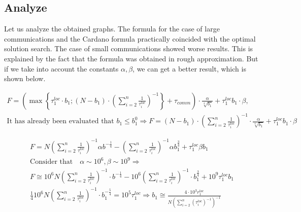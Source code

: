 \documentclass{article}
\begin{document}
\subsection{Analyze}
Let us analyze the obtained graphs. The formula for the case of large communications and the Cardano formula practically coincided with the optimal solution search. The case of small communications showed worse results. This is explained by the fact that the formula was obtained in rough approximation. But if we take into account the constants $\alpha, \beta$, we can get a better result, which is shown below.



\begin{gather*}
    F=\left(\max \left\{\tau_1^{loc} \cdot b_1 ;\left(N-b_1\right) \cdot\left(\sum_{i=2}^n \frac{1}{\tau_i^{loc}}\right)^{-1}\right\}+\tau_{comm}\right) \cdot \frac{\alpha}{\sqrt[4]{b_1}}+\tau_1^{loc} b_1 \cdot \beta, \\
    \text {It has already been evaluated that } b_1 \leq b_1^0 \Rightarrow F=\left(N-b_1\right)\cdot \left(\sum_{i=2}^n \frac{1}{\tau_i^{loc}}\right)^{-1} \cdot \frac{\alpha}{\sqrt[4]{b_1}}+\tau_1^{loc} b_1 \cdot \beta
\end{gather*}


\begin{gather*}
    F=N\left(\sum_{i=2}^n \frac{1}{\tau_i^{loc}}\right)^{-1} \alpha b^{-\frac{1}{4}}-\left(\sum_{i=2}^n \frac{1}{\tau_i^{loc}}\right)^{-1} \alpha b_1^{\frac{3}{4}}+\tau_1^{l o c} \beta b_1 \\
    \text {Consider that} \quad \alpha \sim 10^6, \beta \sim 10^9 \Rightarrow \\ 
    F \cong 10^6 N \left(\sum_{i=2}^n \frac{1}{\tau_i^{loc}}\right)^{-1} \cdot b^{-\frac{1}{4}}-10^6 \left(\sum_{i=2}^n \frac{1}{\tau_i^{loc}}\right)^{-1} \cdot b_1^{\frac{3}{4}}+10^9 \tau_1^{loc} b_1 \\
    \frac{1}{4} 10^6 N \left(\sum_{i=2}^n \frac{1}{\tau_i^{loc}}\right)^{-1} \cdot b_1^{-\frac{5}{4}}=10^5 \tau_1^{loc} \Rightarrow b_1 \cong \frac{4 \cdot 10^3 r_1^{loc}}{N\left(\sum_{i=2}^n\left(\tau_i^{loc}\right)^{-1}\right)^{-1}}
\end{gather*}



  
\end{document}
